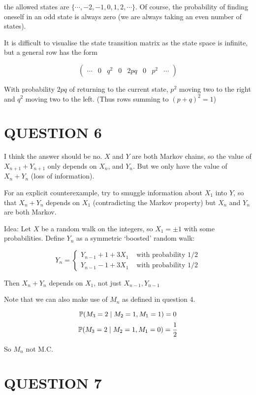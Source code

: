 \documentclass[a4paper]{article}
\begin{document}
the allowed states are $ \{ \cdots,-2,-1,0,1,2,\cdots \} $. Of course, the probability of finding oneself in an odd state is always zero (we are always taking an even number of states).

It is difficult to visualise the state transition matrix as the state space is infinite, but a general row has the form

\[ \begin{pmatrix}
\cdots & 0 & q^{2} & 0 & 2pq & 0 & p^{2} & \cdots
\end{pmatrix} \]

With probability $ 2pq $ of returning to the current state, $ p^{2} $ moving two to the right and $ q^{2} $ moving two to the left. (Thus rows summing to $ (p + q)^{2} = 1 $)




\section{QUESTION 6}

I think the answer should be no. $ X $ and $ Y $ are both Markov chains, so the value of $ X_{n+1} + Y_{n+1} $ only depends on $ X_{n} $, and $ Y_{n} $. But we only have the value of $ X_{n} + Y_{n} $ (loss of information).

For an explicit counterexample, try to smuggle information about $ X_{1} $ into $ Y $, so that $ X_{n} + Y_{n} $ depends on $ X_{1} $ (contradicting the Markov property) but $ X_{n} $ and $ Y_{n} $ are both Markov.

Idea: Let $ X $ be a random walk on the integers, so $ X_{1} = \pm 1 $ with some probabilities. Define $ Y_{n} $ as a symmetric `boosted' random walk:
                                      
\[ Y_{n} = \begin{cases} Y_{n-1} + 1 + 3 X_{1}   & \text{ with probability } 1/2 \\  Y_{n-1} - 1 + 3 X_{1} & \text{ with probability } 1/2 \end{cases} \]

Then $ X_{n} + Y_{n}  $ depends on $ X_{1} $, not just $ X_{n-1},Y_{n-1} $


Note that we can also make use of $ M_{n} $ as defined in question 4. 

\[ \P (M_{3} = 2 \; |  \; M_{2} = 1,M_{1} = 1 ) = 0  \]
\[ \P(M_{3} = 2 \; | \; M_{2} = 1,M_{1} = 0 ) = \frac{1}{2} \]

So $ M_{n} $ not M.C.

\section{QUESTION 7}
\end{document}
